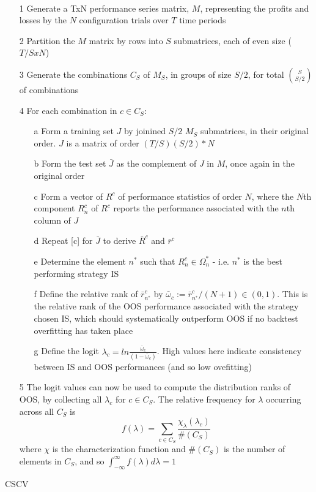 \documentclass[a4paper,latin]{paper}
\begin{document}
\begin{algorithm}[H]
	\texttt{\\}
		
	\begin{itemize}
			\item[1]Generate a TxN performance series matrix, $M$, representing the profits and losses by the $N$ configuration trials over $T$ time periods
			\item[2]Partition the $M$ matrix by rows into $S$ submatrices, each of even size ($T/S x N$)
			\item[3]Generate the combinations $C_S$ of $M_S$, in groups of size $S/2$, for total $\binom{S}{S/2}$ of combinations
			\item[4]For each combination in $c \in C_S$:
			\begin{itemize}
				\item [a] Form a training set $J$ by joinined $S/2$ $M_S$ submatrices, in their original order. $J$ is a matrix of order $(T/S)(S/2)*N $
				\item [b] Form the test set $\bar{J}$ as the complement of $J$ in $M$, once again in the original order
				\item [c] Form a vector of $R^c$ of performance statistics of order $N$, where the $N$th component $R_n^c$ of $R^c$ reports the performance associated with the $n$th column of $J$
				\item [d] Repeat [c] for $\bar{J}$ to derive $\bar{R}^c$ and $\bar{r}^c$
				\item [e] Determine the element $n^*$ such that $R^c_n \in \Omega^*_n$ - i.e. $n^*$ is the best performing strategy IS
				\item [f] Define the relative rank of $\bar{r}^c_{n^*}$ by $\bar{\omega}_c := \bar{r}^c_{n^*} / (N +1) \in (0,1)$. This is the relative rank of the OOS performance associated with the strategy chosen IS, which should systematically outperform OOS if no backtest overfitting has taken place
				\item[g] Define the logit $\lambda_c = ln \frac{\bar{\omega}_c}{(1-\bar{\omega}_c)}$. High values here indicate consistency between IS and OOS performances (and so low ovefitting)
			\end{itemize}
			\item [5] The logit values can now be used to compute the distribution ranks of OOS, by collecting all $\lambda_c$ for $c \in C_S$. The relative frequency for $\lambda$ occurring across all $C_S$ is 
			\begin{equation}
			f(\lambda) = \sum_{c \in C_S}\frac{\chi_{\lambda}(\lambda_c)}{\#(C_S)}
			\end{equation}
			where $\chi$ is the characterization function and $\#(C_S)$ is the number of elements in $C_S$, and so $\int_{-\infty}^{\infty} f (\lambda) d \lambda = 1$
		\end{itemize}
	
	\label{algo_cscv}
	\caption{CSCV}
\end{algorithm}
\end{document}
